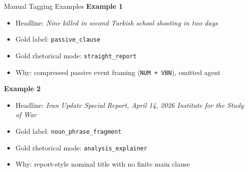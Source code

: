 \documentclass[aspectratio=169, 11pt]{beamer}
\begin{document}
\begin{frame}{Manual Tagging Examples}
  \textbf{Example 1}
  \begin{itemize}
    \item Headline: \textit{Nine killed in second Turkish school shooting in two days}
    \item Gold label: \texttt{passive\_clause}
    \item Gold rhetorical mode: \texttt{straight\_report}
    \item Why: compressed passive event framing (\texttt{NUM + VBN}), omitted agent
  \end{itemize}

  \vspace{0.5em}
  \textbf{Example 2}
  \begin{itemize}
    \item Headline: \textit{Iran Update Special Report, April 14, 2026 Institute for the Study of War}
    \item Gold label: \texttt{noun\_phrase\_fragment}
    \item Gold rhetorical mode: \texttt{analysis\_explainer}
    \item Why: report-style nominal title with no finite main clause
  \end{itemize}
\end{frame}
\end{document}
